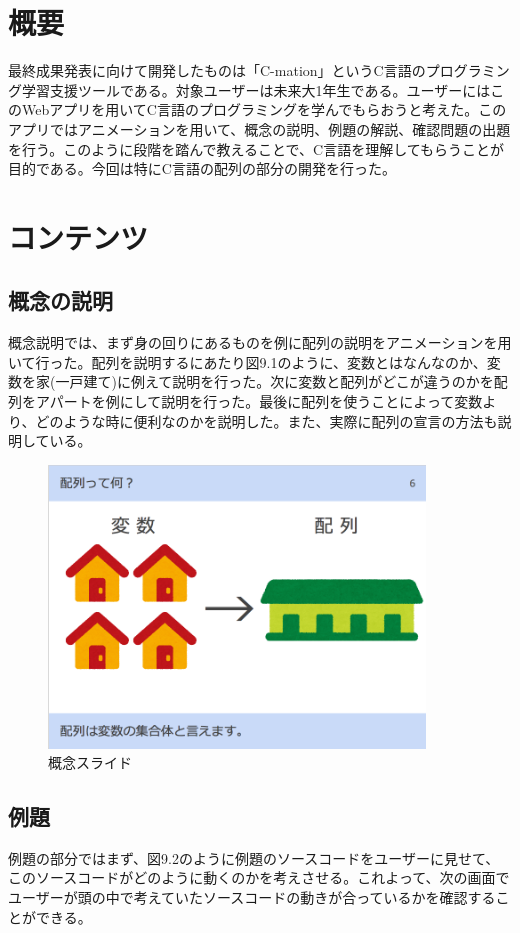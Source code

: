 \documentclass[openany,11pt,papersize]{jsbook}
\begin{document}
\section{概要}
最終成果発表に向けて開発したものは「C-mation」というC言語のプログラミング学習支援ツールである。対象ユーザーは未来大1年生である。ユーザーにはこのWebアプリを用いてC言語のプログラミングを学んでもらおうと考えた。このアプリではアニメーションを用いて、概念の説明、例題の解説、確認問題の出題を行う。このように段階を踏んで教えることで、C言語を理解してもらうことが目的である。今回は特にC言語の配列の部分の開発を行った。

\section{コンテンツ}

\subsection{概念の説明}
概念説明では、まず身の回りにあるものを例に配列の説明をアニメーションを用いて行った。配列を説明するにあたり図9.1のように、変数とはなんなのか、変数を家(一戸建て)に例えて説明を行った。次に変数と配列がどこが違うのかを配列をアパートを例にして説明を行った。最後に配列を使うことによって変数より、どのような時に便利なのかを説明した。また、実際に配列の宣言の方法も説明している。
\begin{figure}[H]
\begin{center}
\includegraphics[width=10cm, bb=0 0 850 638]{img/9thParagraph/gainen_01.png}
\end{center}
\caption{概念スライド}
\end{figure}


\subsection{例題}
例題の部分ではまず、図9.2のように例題のソースコードをユーザーに見せて、このソースコードがどのように動くのかを考えさせる。これよって、次の画面でユーザーが頭の中で考えていたソースコードの動きが合っているかを確認することができる。
\end{document}

